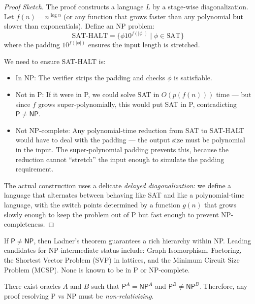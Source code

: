 \begin{proof}[Proof Sketch]
The proof constructs a language $L$ by a stage-wise diagonalization. Let $f(n) = n^{\log n}$ (or any function that grows faster than any polynomial but slower than exponentials). Define an NP problem:
\[
\text{SAT-HALT} = \{ \phi 10^{f(|\phi|)} \mid \phi \in \text{SAT} \}
\]
where the padding $10^{f(|\phi|)}$ ensures the input length is stretched. 

We need to ensure SAT-HALT is:
\begin{itemize}
\item In NP: The verifier strips the padding and checks $\phi$ is satisfiable.
\item Not in P: If it were in P, we could solve SAT in $O(p(f(n)))$ time — but since $f$ grows super-polynomially, this would put SAT in P, contradicting $\mathsf{P} \neq \mathsf{NP}$.
\item Not NP-complete: Any polynomial-time reduction from SAT to SAT-HALT would have to deal with the padding — the output size must be polynomial in the input. The super-polynomial padding prevents this, because the reduction cannot ``stretch'' the input enough to simulate the padding requirement.
\end{itemize}

The actual construction uses a delicate \emph{delayed diagonalization}: we define a language that alternates between behaving like SAT and like a polynomial-time language, with the switch points determined by a function $g(n)$ that grows slowly enough to keep the problem out of P but fast enough to prevent NP-completeness.
\end{proof}

\begin{remark}
If $\mathsf{P} \neq \mathsf{NP}$, then Ladner's theorem guarantees a rich hierarchy within NP. Leading candidates for NP-intermediate status include: Graph Isomorphism, Factoring, the Shortest Vector Problem (SVP) in lattices, and the Minimum Circuit Size Problem (MCSP). None is known to be in P or NP-complete.
\end{remark}

\begin{theorem}
There exist oracles $A$ and $B$ such that $\mathsf{P}^A = \mathsf{NP}^A$ and $\mathsf{P}^B \neq \mathsf{NP}^B$. Therefore, any proof resolving P vs NP must be \emph{non-relativizing}.
\end{theorem}

